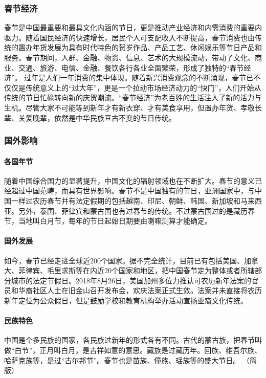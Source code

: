 \subsubsection{春节经济}
春节是中国最重要和最具文化内涵的节日，更是推动产业经济和内需消费的重要内驱力。随着国民经济的快速增长，居民个人可支配收入不断提高，春节消费也由传统的置办年货发展为具有时代特色的贺岁作品、产品工艺、休闲娱乐等节日产品和服务。春节期间，人群、金融、物资、信息、艺术的大规模流动，带动了文化、商业、交通、旅游、电信、金融、餐饮各行各业全面繁荣，形成了独特的“春节经济”。
过年是人们一年消费的集中体现。随着新兴消费观念的不断涌现，春节已不仅仅是传统意义上的“过大年”，更是一个拉动市场经济动力的“快门”，人们开始从传统的节日忙碌转向新的庆贺潮流。“春节经济”为老百姓的生活注入了新的活力与生机。尽管大家不可能等到新年才有新衣穿、才有美食享用，但置办年货、孝敬长辈、关爱晚辈，依然是中华民族亘古不变的节日传统。





\subsubsection{国外影响}

\paragraph{各国年节}
随着中国综合国力的显著提升，中国文化的辐射领域也在不断扩大。春节的意义已经超过中国范畴，而具有世界影响。春节不是中国独有的节日，亚洲国家中，与中国一样过农历春节并有法定假期的包括越南、印尼、朝鲜、韩国、新加坡和马来西亚。另外，泰国、菲律宾和蒙古国也有过春节的传统。不过蒙古国过的是藏历春节，当地叫白月节，每年的节日起始日期要由喇嘛测算才能确定。

\paragraph{国外发展}
如今，春节已经走进全球近200个国家。据不完全统计，目前已有包括美国、加拿大、菲律宾、毛里求斯等在内近20个国家和地区，把中国春节定为整体或者所辖部分城市的法定节假日。2018年8月26日，美国加州多位力推认可农历新年法案的官员和华裔社区人士在旧金山召开发布会，欢庆法案正式生效。法案并未直接将农历新年定位为公众假日，但是鼓励学校和教育机构举办活动宣扬亚裔文化传统。

\paragraph{民族特色}
中国是个多民族的国家，各民族过新年的形式各有不同。古代的蒙古族，把春节叫做“白节”，正月叫白月，是吉祥如意的意思。藏族是过藏历年。回族、维吾尔族、哈萨克族等，是过“古尔邦节”。春节也是苗族、僮族、瑶族等的盛大节日。                                                        （简版）



